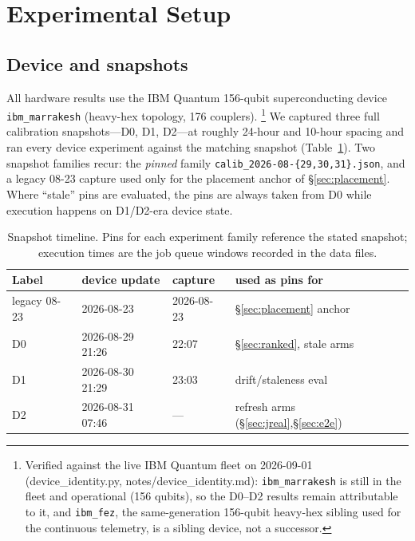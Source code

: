 \documentclass[journal,10pt,twocolumn]{IEEEtran}
\begin{document}
\section{Experimental Setup}
\label{sec:setup}
\subsection{Device and snapshots}
All hardware results use the IBM Quantum 156-qubit superconducting device \texttt{ibm\_marrakesh} (heavy-hex
topology, 176 couplers).%
\footnote{Verified against the live IBM Quantum fleet on 2026-09-01 (device\_identity.py, notes/device\_identity.md):
\texttt{ibm\_marrakesh} is still in the fleet and operational (156 qubits), so the D0--D2 results remain attributable
to it, and \texttt{ibm\_fez}, the same-generation 156-qubit heavy-hex sibling used for the continuous telemetry, is a
sibling device, not a successor.} We captured three full calibration snapshots---D0, D1, D2---at roughly 24-hour and 10-hour
spacing and ran every device experiment against the matching snapshot (Table~\ref{tab:snap}). Two snapshot
families recur: the \emph{pinned} family \texttt{calib\_2026-08-\{29,30,31\}.json}, and a legacy 08-23 capture used
only for the placement anchor of \S\ref{sec:placement}. Where ``stale'' pins are evaluated, the pins are always
taken from D0 while execution happens on D1/D2-era device state.

\begin{table}[t]
\caption{Snapshot timeline. Pins for each experiment family reference the stated snapshot; execution times are the job
queue windows recorded in the data files.}
\label{tab:snap}
\centering
\footnotesize
\setlength{\tabcolsep}{4pt}
\begin{tabular}{@{}lllp{2.9cm}@{}}
\toprule
Label & device update & capture & used as pins for\\
\midrule
legacy 08-23 & 2026-08-23 & 2026-08-23 & \S\ref{sec:placement} anchor\\
D0 & 2026-08-29 21:26 & 22:07 & \S\ref{sec:ranked}, stale arms\\
D1 & 2026-08-30 21:29 & 23:03 & drift/staleness eval\\
D2 & 2026-08-31 07:46 & --- & refresh arms (\S\ref{sec:jreal},\S\ref{sec:e2e})\\
\bottomrule
\end{tabular}
\end{table}
\end{document}
